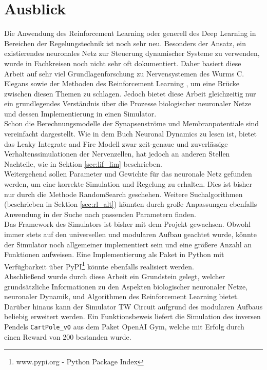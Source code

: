 \section{Ausblick}
\label{sec:erg_ausblick}
	Die Anwendung des Reinforcement Learning oder generell des Deep Learning in Bereichen der Regelungstechnik ist noch sehr neu. Besonders der Ansatz, ein existierendes neuronales Netz zur Steuerung dynamischer Systeme zu verwenden, wurde in Fachkreisen noch nicht sehr oft dokumentiert. Daher basiert diese Arbeit auf sehr viel Grundlagenforschung zu Nervensystemen des Wurms C. Elegans \cite{CElegans} sowie der Methoden des Reinforcement Learning \cite{DeepLearning} \cite{Russell2016}, um eine Brücke zwischen diesen Themen zu schlagen. Jedoch bietet diese Arbeit gleichzeitig nur ein grundlegendes Verständnis über die Prozesse biologischer neuronaler Netze und dessen Implementierung in einen Simulator.\\
	Schon die Berechnungsmodelle der Synapsenströme und Membranpotentiale sind vereinfacht dargestellt. Wie in dem Buch Neuronal Dynamics \cite{NeuronalDynamics} zu lesen ist, bietet das Leaky Integrate and Fire Modell zwar zeit-genaue und zuverlässige Verhaltenssimulationen der Nervenzellen, hat jedoch an anderen Stellen Nachteile, wie in Sektion \ref{sec:lif_lim} beschrieben.\\
	Weitergehend sollen Parameter und Gewichte für das neuronale Netz gefunden werden, um eine korrekte Simulation und Regelung zu erhalten. Dies ist bisher nur durch die Methode RandomSearch geschehen. Weitere Suchalgorithmen (beschrieben in Sektion \ref{sec:rl_alt}) könnten durch große Anpassungen ebenfalls Anwendung in der Suche nach passenden Parametern finden.\\
	Das Framework des Simulators ist bisher mit dem Projekt gewachsen. Obwohl immer stets auf den universellen und modularen Aufbau geachtet wurde, könnte der Simulator noch allgemeiner implementiert sein und eine größere Anzahl an Funktionen aufweisen. Eine Implementierung als Paket in Python mit Verfügbarkeit über PyPI\footnote{www.pypi.org - Python Package Index} könnte ebenfalls realisiert werden.\\
	Abschließend wurde durch diese Arbeit ein Grundstein gelegt, welcher grundsätzliche Informationen zu den Aspekten biologischer neuronaler Netze, neuronaler Dynamik, und Algorithmen des Reinforcement Learning bietet. Darüber hinaus kann der Simulator TW Circuit aufgrund des modularen Aufbaus beliebig erweitert werden. Ein Funktionsbeweis liefert die Simulation des inversen Pendels \texttt{CartPole\_v0} aus dem Paket OpenAI Gym, welche mit Erfolg durch einen Reward von 200 bestanden wurde.

